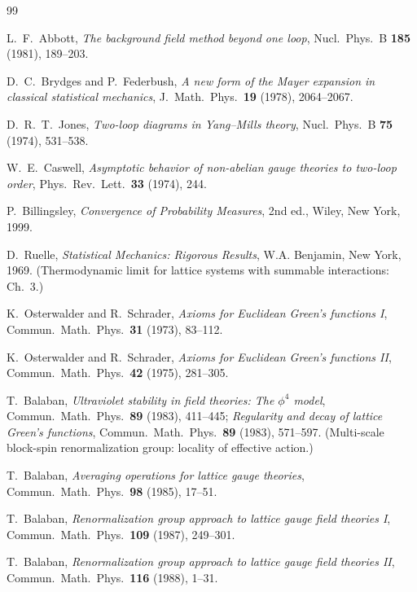 \documentclass[11pt,a4paper]{amsart}
\theoremstyle{definition}
\begin{document}
\begin{thebibliography}{99}

L.~F.~Abbott,
\textit{The background field method beyond one loop},
Nucl.~Phys.~B \textbf{185} (1981), 189--203.

D.~C.~Brydges and P.~Federbush,
\textit{A new form of the Mayer expansion in classical statistical mechanics},
J.~Math.~Phys.\ \textbf{19} (1978), 2064--2067.

D.~R.~T.~Jones,
\textit{Two-loop diagrams in Yang--Mills theory},
Nucl.~Phys.~B \textbf{75} (1974), 531--538.

W.~E.~Caswell,
\textit{Asymptotic behavior of non-abelian gauge theories to two-loop order},
Phys.~Rev.~Lett.\ \textbf{33} (1974), 244.

P.~Billingsley,
\textit{Convergence of Probability Measures}, 2nd ed.,
Wiley, New York, 1999.

D.~Ruelle,
\textit{Statistical Mechanics: Rigorous Results},
W.A. Benjamin, New York, 1969.
(Thermodynamic limit for lattice systems with summable interactions: Ch.~3.)

K.~Osterwalder and R.~Schrader,
\textit{Axioms for Euclidean Green's functions I},
Commun.~Math.~Phys.\ \textbf{31} (1973), 83--112.

K.~Osterwalder and R.~Schrader,
\textit{Axioms for Euclidean Green's functions II},
Commun.~Math.~Phys.\ \textbf{42} (1975), 281--305.

T.~Balaban,
\textit{Ultraviolet stability in field theories: The $\phi^4$ model},
Commun.~Math.~Phys.\ \textbf{89} (1983), 411--445;
\textit{Regularity and decay of lattice Green's functions},
Commun.~Math.~Phys.\ \textbf{89} (1983), 571--597.
(Multi-scale block-spin renormalization group: locality of effective action.)

T.~Balaban,
\textit{Averaging operations for lattice gauge theories},
Commun.~Math.~Phys.\ \textbf{98} (1985), 17--51.

T.~Balaban,
\textit{Renormalization group approach to lattice gauge field theories I},
Commun.~Math.~Phys.\ \textbf{109} (1987), 249--301.

T.~Balaban,
\textit{Renormalization group approach to lattice gauge field theories II},
Commun.~Math.~Phys.\ \textbf{116} (1988), 1--31.


\end{thebibliography}
\end{document}
